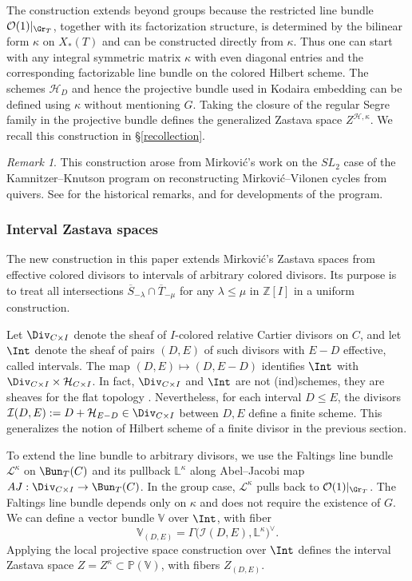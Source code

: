 \documentclass{amsart}
\numberwithin{equation}{section}
\numberwithin{figure}{section}
\theoremstyle{definition}
\theoremstyle{remark}
\newtheorem{rmk}[thm]{Remark}
\renewcommand{\b}[1]{\mathbb{#1}}
\begin{document}
The construction extends beyond groups because the restricted line
bundle $\mathcal O(1)|_{\Gr_T}$, together with its factorization
structure, is determined by the bilinear form $\kappa$ on $X_*(T)$ and can be
constructed directly from $\kappa$. Thus one can start with any
integral symmetric matrix $\kappa$ with even diagonal entries and the
corresponding factorizable line bundle on the colored Hilbert scheme.
The schemes $\mathcal H_D$ and hence the projective bundle used in Kodaira embedding can be defined using $\kappa$ without mentioning $G$.
Taking the closure of the regular Segre family in the projective bundle
defines the generalized Zastava space $Z^{\mathcal H,\kappa}$.
We recall this construction in \S\ref{recollection}.
\begin{rmk}
This construction arose from Mirkovi\'c's work on the
$SL_2$ case of the Kamnitzer--Knutson program on
reconstructing Mirkovi\'c--Vilonen cycles from quivers.
See \cite[\S1.1.6 and \S4]{mirkovic2014loop} for the historical
remarks, and \cite[\S1.6--1.7,12.2]{baumann2021mirkovic}
for developments of the program.
\end{rmk}
\subsubsection{Interval Zastava spaces}

The new construction in this paper extends Mirkovi\'c's Zastava
spaces from effective colored divisors to intervals of arbitrary
colored divisors. Its purpose is to treat all intersections
$\overline S_{-\lambda}\cap\overline T_{-\mu}$ for any
$\lambda\leq\mu$ in $\mathbb Z[I]$ in a uniform construction.

Let $\Div_{C\times I}$ denote the sheaf of $I$-colored relative
Cartier divisors on $C$, and let $\Int$ denote the sheaf of pairs
$(D,E)$ of such divisors with $E-D$ effective, called intervals.
The map $(D,E)\mapsto(D,E-D)$ identifies $\Int$ with
$\Div_{C\times I}\times\mathcal H_{C\times I}$. In fact,
$\Div_{C\times I}$ and $\Int$ are not (ind)schemes,
they are sheaves for the flat topology \cite[3.10.7]{beilinson2004chiral}. Nevertheless,
for each interval $D\leq E$, the divisors $\mathcal I(D,E):=D+\mathcal H_{E-D}\in \Div_{C\times I}$ between $D,E$ define a finite scheme. This generalizes the notion of Hilbert scheme of a finite divisor in the previous section.

To extend the line bundle to arbitrary divisors, we use the Faltings
line bundle $\mathcal L^\kappa$ on $\Bun_T(C)$ \cite{faltings2003algebraic} and its pullback
$\mathbb L^\kappa$ along Abel--Jacobi map
$AJ:\Div_{C\times I}\to\Bun_T(C)$. In the group case,
$\mathcal L^\kappa$ pulls back to
$\mathcal O(1)|_{\Gr_T}$.
The Faltings line bundle depends only on $\kappa$ and does not
require the existence of $G$.
We can define a vector bundle $\b V$ over $\Int$, with fiber
\[
\mathbb V_{(D,E)}
=\Gamma\bigl(\mathcal I(D,E),\mathbb L^\kappa\bigr)^\vee.
\]
Applying the local projective space construction over $\Int$
defines the interval Zastava space $Z=Z^\kappa\subset\mathbb P(\mathbb V)$,
with fibers $Z_{(D,E)}$.
\end{document}
